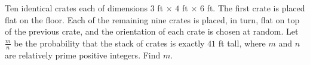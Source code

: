 Ten identical crates each of dimensions $ 3$ ft $ \times$ $ 4$ ft $ \times$ $ 6$ ft.  The first crate is placed flat on the floor.  Each of the remaining nine crates is placed, in turn, flat on top of the previous crate, and the orientation of each crate is chosen at random.  Let $ \frac{m}{n}$ be the probability that the stack of crates is exactly $ 41$ ft tall, where $ m$ and $ n$ are relatively prime positive integers.  Find $ m$.